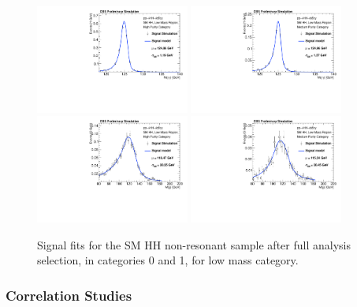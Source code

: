 \begin{figure}[thb]
  \centering
  \includegraphics[width=0.45\textwidth]{figures/sec-signals/SMLM_signal_fit_mgg_cat0}\hfil
  \includegraphics[width=0.45\textwidth]{figures/sec-signals/SMLM_signal_fit_mgg_cat1}\hfil
  \includegraphics[width=0.45\textwidth]{figures/sec-signals/SMLM_signal_fit_mjj_cat0}\hfil
  \includegraphics[width=0.45\textwidth]{figures/sec-signals/SMLM_signal_fit_mjj_cat1}\hfil
  \caption{Signal fits for the SM HH non-resonant sample after full analysis selection, in categories 0 and 1, for low mass category.}
  \label{fig:sig_highmassSM}
\end{figure}

\subsubsection{Correlation Studies}

